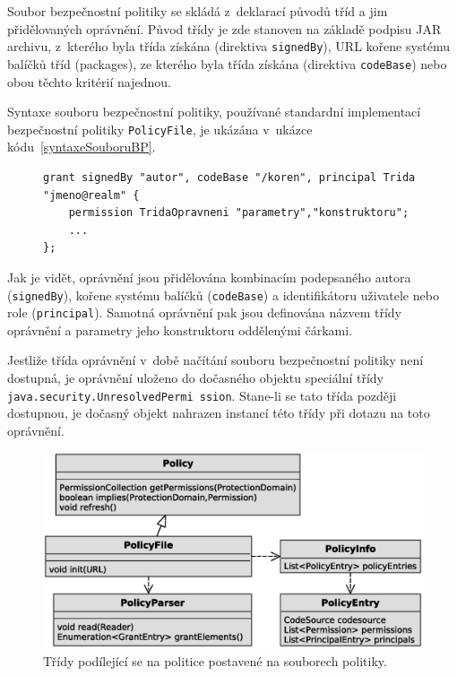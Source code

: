 Soubor bezpečnostní politiky se skládá z~deklarací původů tříd a jim přidělovaných oprávnění.
Původ třídy je zde stanoven na základě podpisu JAR archivu, z~kterého byla třída získána (direktiva {\tt signedBy}), URL kořene systému balíčků tříd (packages), ze kterého byla třída získána (direktiva {\tt codeBase}) nebo obou těchto kritérií najednou.~\cite{oaks}

Syntaxe souboru bezpečnostní politiky, používané standardní implementací bezpečnostní politiky {\tt PolicyFile}, je ukázána v~ukázce kódu~\ref{syntaxeSouboruBP}.

\begin{figure}[tbh]
\begin{lstlisting}[caption=Syntaxe souboru bezpečnostní politiky~\cite{oaks}\cite{refPolicyFiles}, label=syntaxeSouboruBP]
grant signedBy "autor", codeBase "/koren", principal Trida "jmeno@realm" {
    permission TridaOpravneni "parametry","konstruktoru";
    ...
};
\end{lstlisting}
\end{figure}

Jak je vidět, oprávnění jsou přidělována kombinacím podepsaného autora ({\tt signedBy}), kořene systému balíčků ({\tt codeBase}) a identifikátoru uživatele nebo role ({\tt principal}).
Samotná oprávnění pak jsou definována názvem třídy oprávnění a parametry jeho konstruktoru oddělenými čárkami.

Jestliže třída oprávnění v~době načítání souboru bezpečnostní politiky není dostupná, je oprávnění uloženo do dočasného objektu speciální třídy {\tt java.security.UnresolvedPermi ssion}.
Stane-li se tato třída později dostupnou, je dočasný objekt nahrazen instancí této třídy při dotazu na toto oprávnění.~\cite{refUnresolvedPermission}

\begin{figure}[ht]
  \centering
  \includegraphics[width=12cm]{fig/policy-schema}
  \caption{Třídy podílející se na politice postavené na souborech politiky.}
  \label{tridyPolicyFile}
\end{figure}

